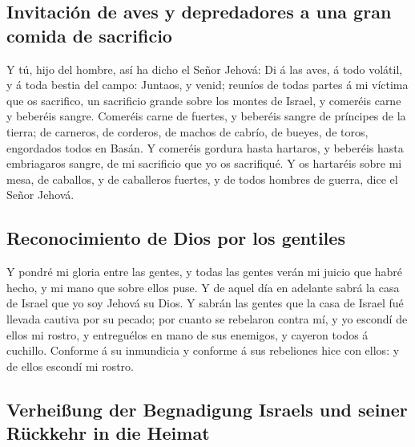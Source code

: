\hypertarget{invitaciuxf3n-de-aves-y-depredadores-a-una-gran-comida-de-sacrificio}{%
\subsection{Invitación de aves y depredadores a una gran comida de
sacrificio}\label{invitaciuxf3n-de-aves-y-depredadores-a-una-gran-comida-de-sacrificio}}

 Y tú, hijo del hombre, así ha dicho el Señor Jehová: Di á
las aves, á todo volátil, y á toda bestia del campo: Juntaos, y venid;
reuníos de todas partes á mi víctima que os sacrifico, un sacrificio
grande sobre los montes de Israel, y comeréis carne y beberéis sangre.
 Comeréis carne de fuertes, y beberéis sangre de príncipes
de la tierra; de carneros, de corderos, de machos de cabrío, de bueyes,
de toros, engordados todos en Basán.  Y comeréis gordura
hasta hartaros, y beberéis hasta embriagaros sangre, de mi sacrificio
que yo os sacrifiqué.  Y os hartaréis sobre mi mesa, de
caballos, y de caballeros fuertes, y de todos hombres de guerra, dice el
Señor Jehová.

\hypertarget{reconocimiento-de-dios-por-los-gentiles}{%
\subsection{Reconocimiento de Dios por los
gentiles}\label{reconocimiento-de-dios-por-los-gentiles}}

 Y pondré mi gloria entre las gentes, y todas las gentes
verán mi juicio que habré hecho, y mi mano que sobre ellos puse.
 Y de aquel día en adelante sabrá la casa de Israel que yo
soy Jehová su Dios.  Y sabrán las gentes que la casa de
Israel fué llevada cautiva por su pecado; por cuanto se rebelaron contra
mí, y yo escondí de ellos mi rostro, y entreguélos en mano de sus
enemigos, y cayeron todos á cuchillo.  Conforme á su
inmundicia y conforme á sus rebeliones hice con ellos: y de ellos
escondí mi rostro.

\hypertarget{verheiuxdfung-der-begnadigung-israels-und-seiner-ruxfcckkehr-in-die-heimat}{%
\subsection{Verheißung der Begnadigung Israels und seiner Rückkehr in
die
Heimat}\label{verheiuxdfung-der-begnadigung-israels-und-seiner-ruxfcckkehr-in-die-heimat}}

